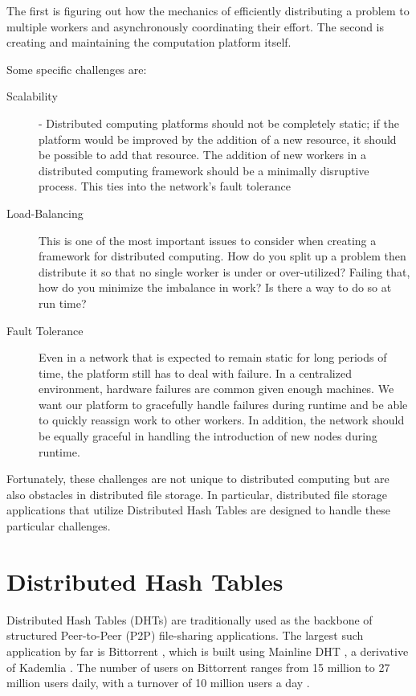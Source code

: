 \documentclass[10pt,letterpaper,twoside]{report}
\begin{document}
The first is figuring out how the mechanics of efficiently distributing a problem to multiple workers and asynchronously coordinating their effort.  
The second is creating and maintaining the computation platform itself.


Some specific challenges are:
\begin{description}
	\item[Scalability] - Distributed computing platforms should not be completely static; if the platform would be improved by the addition of a new resource, it should be possible to add that resource.  
	The addition of new workers in a distributed computing framework should be a minimally disruptive process.
    This ties into the network's fault tolerance
	\item[Load-Balancing]  This is one of the most important issues to consider when creating a framework for distributed computing. 
    How do you split up a problem then distribute it so that no single worker is under or over-utilized?
    Failing that, how do you minimize the imbalance in work?
    Is there a way to do so at run time?
    \item[Fault Tolerance]  Even in a network that is expected to remain static for long periods of time, the platform still has to deal with failure.  
    In a centralized environment, hardware failures are common given enough machines.
    We want our platform to gracefully handle failures during runtime and be able to quickly reassign work to other workers.
    In addition, the network should be equally graceful in handling the introduction of new nodes during runtime.
\end{description}

Fortunately, these challenges are not unique to distributed computing but are also obstacles in distributed file storage.  
In particular, distributed file storage applications that utilize Distributed Hash Tables are designed to handle these particular challenges.
\section{Distributed Hash Tables}
Distributed Hash Tables (DHTs) are traditionally used as the backbone of structured Peer-to-Peer (P2P) file-sharing applications.
The largest such application by far is Bittorrent \cite{bittorrent}, which is built using Mainline DHT \cite{mainline},  a  derivative of Kademlia \cite{kademlia}.
The number of users on Bittorrent ranges from 15 million to 27 million users daily, with a turnover of 10 million users a day \cite{mainlineMeasure}.
\end{document}
